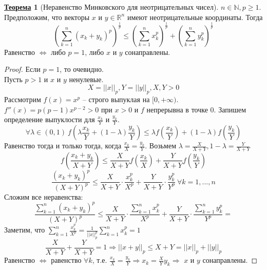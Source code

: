 \documentclass[12pt]{article}
\def\N{\mathbb{N}}       %
\def\R{\mathbb{R}}       %
\def\SO{\Rightarrow}     %
\def\EQ{\Leftrightarrow} %
\theoremstyle{definition} %
\newtheorem{Thm}{\underline{Теорема}}[subsection] %
\theoremstyle{plain} %
\theoremstyle{remark} %
\begin{document}
\begin{Thm}[Неравенство Минковского для неотрицательных чисел]
    $n \in \N, p \geqslant 1$. Предположим, что векторы $x$ и $y \in \R^n$ имеют неотрицательные координаты. Тогда
    \[ \left(\sum_{k=1}^{n} (x_k + y_k)^p \right)^{\frac{1}{p}} \leqslant \left( \sum_{k=1}^{n} x_k^p\right)^{\frac{1}{p}} + \left(\sum_{k = 1}^n y_k^p\right)^{\frac{1}{p}}\]
    Равенство $\EQ$ либо $p = 1$, либо $x$ и $y$ сонаправлены.
\end{Thm}

\begin{proof}
    Если $p = 1$, то очевидно. \\
    Пусть $p > 1$ и $x$ и $y$ ненулевые.
    \[X = ||x||_p, Y = ||y||_p, X, Y > 0\]
    Рассмотрим $f(x) = x^p$ -- строго выпуклая на $[0, +\infty)$.
    $f''(x) = p(p - 1)x^{p - 2} > 0$ при $x > 0$ и $f$ непрерывна в точке $0$.
    Запишем определение выпуклости для $ \frac{x_k}{Y}$ и $ \frac{y_k}{Y}$.
    \[\forall \lambda \in (0, 1) \ f\left(\lambda \frac{x_k}{Y} + (1 - \lambda)\frac{y_k}{Y}\right) \leqslant \lambda f\left(\frac{x_k}{Y}\right) + (1 - \lambda) f\left(\frac{y_k}{Y}\right)\]
    Равенство тогда и только тогда, когда $ \frac{x_k}{X} = \frac{y_k}{Y}$. Возьмем $\lambda = \frac{X}{X + Y}, 1 - \lambda = \frac{Y}{X + Y}$
    \[f \left( \frac{x_k + y_k}{X + Y}\right) \leqslant \frac{X}{X + Y} f \left( \frac{x_k}{X}\right) + \frac{Y}{X + Y} f \left( \frac{y_k}{Y}\right)\]
    \[ \frac{(x_k + y_k)^p}{(X + Y)^p} \leqslant \frac{X}{X + Y} \cdot \frac{x_k^p}{X^p} + \frac{Y}{X + Y} \cdot \frac{y_k^p}{Y^p} \ \forall k = 1, ..., n\]
    Сложим все неравенства:
    \[ \frac{\sum_{k = 1}^n (x_k + y_k)^p}{(X + Y)^p} \leqslant \frac{X}{X + Y} \cdot \frac{\sum_{k=1}^n x_k^p}{X^p} + \frac{Y}{X + Y} \cdot \frac{\sum_{k=1}^n y_k^p}{Y^p} =\]
    Заметим, что $\sum_{k=1}^{n} \frac{x_k^p}{X^p} = \frac{1}{||x||_p^p} \sum_{k=1}^{n} x_k^p = 1$ 
    \[\frac{X}{X + Y} + \frac{Y}{X + Y} = 1 \SO ||x + y||_p \leqslant X + Y = ||x||_p + ||y||_p\]
    Равенство $\EQ$ равенство $\forall k$, т.е. $ \frac{x_k}{X} = \frac{y_k}{Y} \SO x_k = \frac{X}{Y} y_k \SO$ $x$ и $y$ сонаправлены. 
\end{proof}
\end{document}
